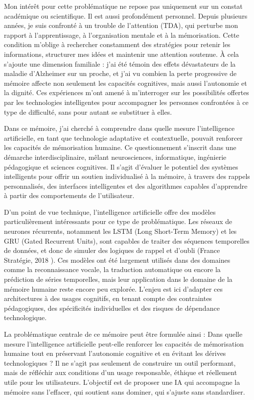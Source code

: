 \documentclass[11pt,a4paper]{report}
\begin{document}
Mon intérêt pour cette problématique ne repose pas uniquement sur un constat académique ou scientifique. Il est aussi profondément personnel. Depuis plusieurs années, je suis confronté à un trouble de l’attention (TDA), qui perturbe mon rapport à l’apprentissage, à l’organisation mentale et à la mémorisation. Cette condition m’oblige à rechercher constamment des stratégies pour retenir les informations, structurer mes idées et maintenir une attention soutenue. À cela s’ajoute une dimension familiale : j’ai été témoin des effets dévastateurs de la maladie d’Alzheimer sur un proche, et j’ai vu combien la perte progressive de mémoire affecte non seulement les capacités cognitives, mais aussi l’autonomie et la dignité. Ces expériences m’ont amené à m’interroger sur les possibilités offertes par les technologies intelligentes pour accompagner les personnes confrontées à ce type de difficulté, sans pour autant se substituer à elles.

Dans ce mémoire, j’ai cherché à comprendre dans quelle mesure l’intelligence artificielle, en tant que technologie adaptative et contextuelle, pouvait renforcer les capacités de mémorisation humaine. Ce questionnement s’inscrit dans une démarche interdisciplinaire, mêlant neurosciences, informatique, ingénierie pédagogique et sciences cognitives. Il s’agit d’évaluer le potentiel des systèmes intelligents pour offrir un soutien individualisé à la mémoire, à travers des rappels personnalisés, des interfaces intelligentes et des algorithmes capables d’apprendre à partir des comportements de l’utilisateur.

D’un point de vue technique, l’intelligence artificielle offre des modèles particulièrement intéressants pour ce type de problématique. Les réseaux de neurones récurrents, notamment les LSTM (Long Short-Term Memory) et les GRU (Gated Recurrent Units), sont capables de traiter des séquences temporelles de données, et donc de simuler des logiques de rappel et d’oubli (France Stratégie, 2018 \cite{francestrategie}). Ces modèles ont été largement utilisés dans des domaines comme la reconnaissance vocale, la traduction automatique ou encore la prédiction de séries temporelles, mais leur application dans le domaine de la mémoire humaine reste encore peu explorée. L’enjeu est ici d’adapter ces architectures à des usages cognitifs, en tenant compte des contraintes pédagogiques, des spécificités individuelles et des risques de dépendance technologique.

La problématique centrale de ce mémoire peut être formulée ainsi : Dans quelle mesure l’intelligence artificielle peut-elle renforcer les capacités de mémorisation humaine tout en préservant l’autonomie cognitive et en évitant les dérives technologiques ? Il ne s’agit pas seulement de construire un outil performant, mais de réfléchir aux conditions d’un usage responsable, éthique et réellement utile pour les utilisateurs. L’objectif est de proposer une IA qui accompagne la mémoire sans l’effacer, qui soutient sans dominer, qui s’ajuste sans standardiser.
\end{document}
